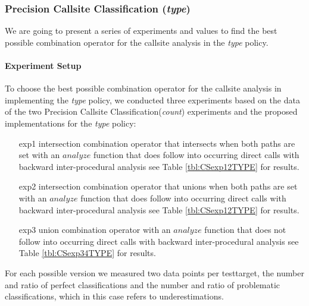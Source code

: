 %	
%
%
%
\newpage
\subsubsection{Precision Callsite Classification (\textit{type})}
\label{subsection:typeshieldprecision}
We are going to present a series of experiments and values to find the best possible combination operator for the callsite analysis in the \textit{type} policy.

\paragraph{Experiment Setup}
To choose the best possible combination operator for the callsite analysis in implementing the \textit{type} policy, we conducted three  experiments based on the data of the two Precision Callsite Classification(\textit{count}) experiments and the proposed implementations for the \textit{type} policy:
\begin{enumerate}
\item[exp1] intersection combination operator that intersects when both paths are set with an $analyze$ function that does follow into occurring direct calls with backward inter-procedural analysis see Table \ref{tbl:CSexp12TYPE} for results.

\item[exp2] intersection combination operator that unions when both paths are set with an $analyze$ function that does follow into occurring direct calls  with backward inter-procedural analysis  see Table \ref{tbl:CSexp12TYPE} for results.

\item[exp3] union combination operator with an $analyze$ function that does not follow into occurring direct calls  with backward inter-procedural analysis  see Table \ref{tbl:CSexp34TYPE} for results.

\end{enumerate}
For each possible version we measured two data points per testtarget, the number and ratio of perfect classifications and the number and ratio of problematic classifications, which in this case refers to underestimations.
